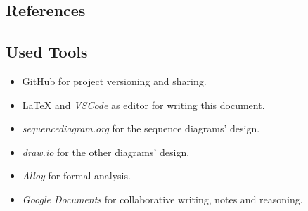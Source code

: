 \subsection{References}

\subsection{Used Tools}
\begin{itemize}
    \item GitHub for project versioning and sharing.
    \item \LaTeX{} and \textit{VSCode} as editor for writing this document.
    \item \textit{sequencediagram.org} for the sequence diagrams' design.
    \item \textit{draw.io} for the other diagrams' design.
    \item \textit{Alloy} for formal analysis.
    \item \textit{Google Documents} for collaborative writing, notes and reasoning.
\end{itemize}
